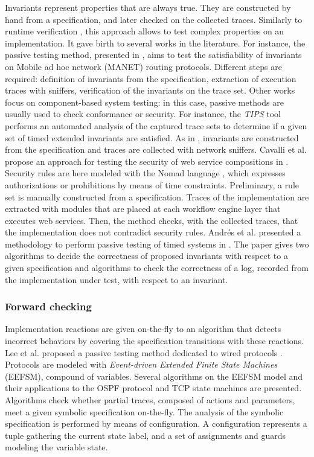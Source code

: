 Invariants represent properties that are always true. They are
constructed by hand from a specification, and later checked on
the collected traces. Similarly to runtime verification
\cite{Leucker2009293}, this approach allows to test complex
properties on an implementation. It gave birth to several works
in the literature. For instance, the passive testing method,
presented in \cite{CMdO09}, aims to test the satisfiability of
invariants on Mobile ad hoc network (MANET) routing protocols.
Different steps are required: definition of invariants from the
specification, extraction of execution traces with sniffers,
verification of the invariants on the trace set. Other works
focus on component-based system testing: in this case, passive
methods are usually used to check conformance or security. For
instance, the \textit{TIPS} tool \cite{5552735} performs an
automated analysis of the captured trace sets to determine if a
given set of timed extended invariants are satisfied. As in
\cite{CMdO09}, invariants are constructed from the specification
and traces are collected with network sniffers. Cavalli et al.
propose an approach for testing the security of web service
compositions in \cite{cavalli2009passive}. Security rules are
here modeled with the Nomad language \cite{cuppens2005nomad},
which expresses authorizations or prohibitions by means of
time constraints. Preliminary, a rule set is manually
constructed from a specification. Traces of the implementation
are extracted with modules that are placed at each workflow
engine layer that executes web services. Then, the method checks,
with the collected traces, that the implementation does not
contradict security rules. Andrés et al. presented a methodology
to perform passive testing of timed systems in
\cite{andres2012formal}. The paper gives two algorithms to decide
the correctness of proposed invariants with respect to a given
specification and algorithms to check the correctness of a log,
recorded from the implementation under test, with respect to an
invariant.

\subsubsection{Forward checking}

Implementation reactions are given on-the-fly to an algorithm
that detects incorrect behaviors by covering the specification
transitions with these reactions. Lee et al. proposed a passive
testing method dedicated to wired protocols \cite{1621118}.
Protocols are modeled with \textit{Event-driven Extended Finite
State Machines} (EEFSM), compound of variables.  Several
algorithms on the EEFSM model and their applications to the OSPF
protocol and TCP state machines are presented. Algorithms check
whether partial traces, composed of actions and parameters, meet
a given symbolic specification on-the-fly. The analysis of the
symbolic specification is performed by means of configuration. A
configuration represents a tuple gathering the current state
label, and a set of assignments and guards modeling the variable
state.


